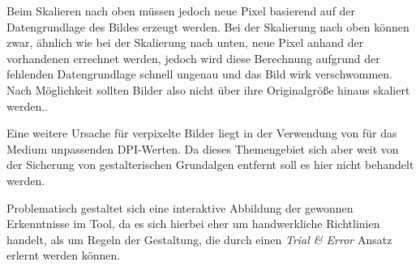 Beim Skalieren nach oben müssen jedoch neue Pixel basierend auf der Datengrundlage des Bildes erzeugt werden. Bei der Skalierung nach oben können zwar, ähnlich wie bei der Skalierung nach unten, neue Pixel anhand der vorhandenen errechnet werden, jedoch wird diese Berechnung aufgrund der fehlenden Datengrundlage schnell ungenau und das Bild wirk verschwommen. Nach Möglichkeit sollten Bilder also nicht über ihre Originalgröße hinaus skaliert werden..

Eine weitere Ursache für verpixelte Bilder liegt in der Verwendung von für das Medium unpassenden DPI-Werten. Da dieses Themengebiet sich aber weit von der Sicherung von gestalterischen Grundalgen entfernt soll es hier nicht behandelt werden.

Problematisch gestaltet sich eine interaktive Abbildung der gewonnen Erkenntnisse im Tool, da es sich hierbei eher um handwerkliche Richtlinien handelt, als um Regeln der Gestaltung, die durch einen \textit{Trial \& Error} Ansatz erlernt werden können.